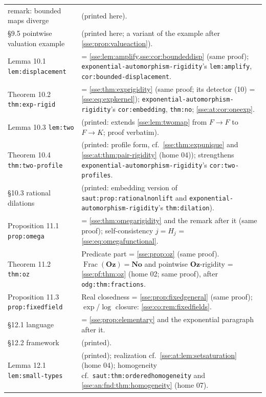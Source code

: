\documentclass[11pt,a4paper]{article}
\numberwithin{equation}{section}
\theoremstyle{plain}
\theoremstyle{definition}
\theoremstyle{remark}
\newcommand{\No}{\mathbf{No}}
\newcommand{\Oz}{\mathbf{Oz}}
\newcommand{\lbl}[1]{\nolinkurl{#1}}%
\newcommand{\fn}[1]{\nolinkurl{#1}}%
\begin{document}
\begin{longtable}{P{34mm}P{116mm}}
remark: bounded maps diverge &  (printed here). \\
\S9.5 pointwise valuation example &  (printed here; a variant of the example after \cref{sse:prop:valueaction}). \\
Lemma 10.1 \fn{lem:displacement} & = \cref{sse:lem:amplify,sse:cor:boundeddisp} (same proof); \fn{exponential-automorphism-rigidity}'s \lbl{lem:amplify}, \lbl{cor:bounded-displacement}. \\
Theorem 10.2 \fn{thm:exp-rigid} & = \cref{sse:thm:exprigidity} (same proof; its detector (10) = \eqref{sse:eq:expkernel}); \fn{exponential-automorphism-rigidity}'s \lbl{cor:embedding}, \lbl{thm:no}; \cref{sse:at:cor:oneexp}. \\
Lemma 10.3 \fn{lem:two} &  (printed: extends \cref{sse:lem:twomap} from $F\to F$ to $F\to K$; proof verbatim). \\
Theorem 10.4 \fn{thm:two-profile} &  (printed: profile form, cf.\ \cref{sse:thm:expunique} and \cref{sse:at:thm:pair-rigidity} (home 04)); strengthens \fn{exponential-automorphism-rigidity}'s \lbl{cor:two-profiles}. \\
\S10.3 rational dilations &  (printed: embedding version of \lbl{saut:prop:rationalnonlift} and \fn{exponential-automorphism-rigidity}'s \lbl{thm:dilation}). \\
Proposition 11.1 \fn{prop:omega} & = \cref{sse:thm:omegarigidity} and the remark after it (same proof); self-consistency $j=H_j$ = \eqref{sse:eq:omegafunctional}. \\
Theorem 11.2 \fn{thm:oz} & Predicate part = \cref{sse:prop:oz} (same proof). $\operatorname{Frac}(\Oz)=\No$ and pointwise $\Oz$-rigidity = \cref{sse:pf:thm:oz} (home 02; same proof), after \lbl{odg:thm:fractions}. \\
Proposition 11.3 \fn{prop:fixedfield} & Real closedness = \cref{sse:prop:fixedgeneral} (same proof); $\exp$/$\log$ closure: \cref{sse:co:rem:fixedfields}. \\
\S12.1 language & = \cref{sse:prop:elementary} and the exponential paragraph after it. \\
\S12.2 framework &  (printed). \\
Lemma 12.1 \fn{lem:small-types} &  (printed); realization cf.\ \cref{sse:at:lem:setsaturation} (home 04); homogeneity cf.\ \lbl{saut:thm:orderedhomogeneity} and \cref{sse:an:fnd:thm:homogeneity} (home 07). \\

\end{longtable}
\end{document}
